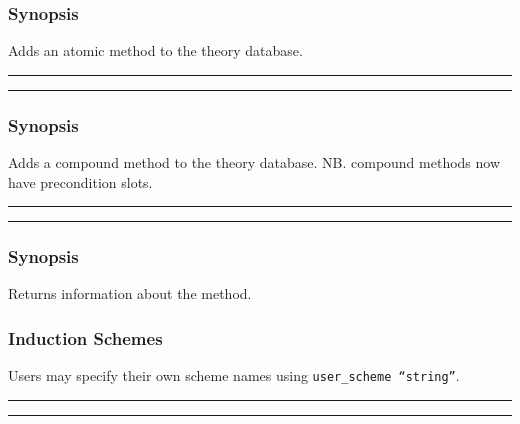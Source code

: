 \subsubsection*{Synopsis}
Adds an atomic method to the theory database.

\vspace{2mm}
\hrule
\vspace{2mm}
\begin{Large}
\end{Large}
\vspace{2mm}
\hrule
\vspace{2mm}


\subsubsection*{Synopsis}
Adds a compound method to the theory database.
NB.  compound methods now have precondition slots.

\vspace{2mm}
\hrule
\vspace{2mm}
\begin{Large}
\end{Large}
\vspace{2mm}
\hrule
\vspace{2mm}


\subsubsection*{Synopsis}
Returns information about the method.

\subsubsection{Induction Schemes}
Users may specify their own scheme names using {\tt user\_scheme
  ``string''}. 

\vspace{2mm}
\hrule
\vspace{2mm}
\begin{Large}
\end{Large}
\vspace{2mm}
\hrule
\vspace{2mm}

